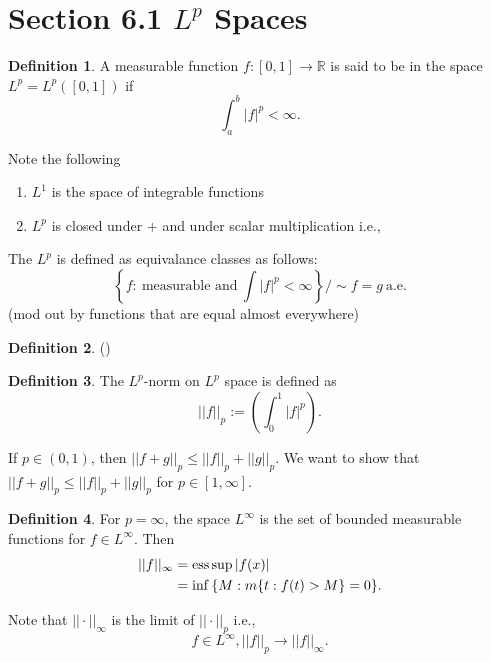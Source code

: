\documentclass[12pt]{article}
\newcommand{\R}{\mathbb{R}}
\def\ess{\mathop{\rm ess}\nolimits}
\theoremstyle{definition}
\newtheorem*{definition}{Definition}
\begin{document}
\section*{Section 6.1 \(L^p\) Spaces}

\begin{definition}
    A measurable function \( f: [0,1] \to \R \) is said to be in the space \( L^p = L^{p}([0,1]) \) if
        \[
            \int_{a}^{b} |f|^{p} < \infty . 
        \]
\end{definition}

Note the following 
    \begin{enumerate}[label = (\arabic{*})]
        \item \( L^1 \) is the space of integrable functions
        \item \( L^p \) is closed under \( +  \) and under scalar multiplication i.e., 
    \end{enumerate}

The \( L^p \) is defined as equivalance classes as follows:
    \[
        \left\{ f: \ \text{measurable and} \ \int |f|^p < \infty \right\}  /\sim f = g \ \text{a.e.}
    \]
(mod out by functions that are equal almost everywhere)
\begin{definition}
    ()
\end{definition}

\begin{definition}
    The \( L^p \)-norm  on \( L^p \) space is defined as 
        \[
            || f ||_{p} := \left( \int_{0}^{1}|f|^{p} \right).
        \]
\end{definition}

If \( p \in (0,1 ) \), then \( ||f+ g||_{p} \leq ||f||_{p} + ||g||_{p}\). We want to show that \( ||f + g||_{p} \leq ||f||_{p} + ||g||_{p} \) for \( p \in [1, \infty] \).

\begin{definition}
    For \( p = \infty \), the space \( L^{\infty }\) is the set of bounded measurable functions for \( f \in L^{\infty} \). Then
        \begin{align*}
            ||f||_{\infty} &= \ess \sup |f(x)|   \\
                           &= \inf \left\{ M : m\{t: f(t) > M \right\} = 0\}.
        \end{align*}
\end{definition}

Note that \( ||\cdot||_{\infty} \) is the limit of \( ||\cdot||_{p} \) i.e., 
    \[
        f \in L^{\infty}, ||f||_{p} \to ||f||_{\infty}.  
    \]
\end{document}
